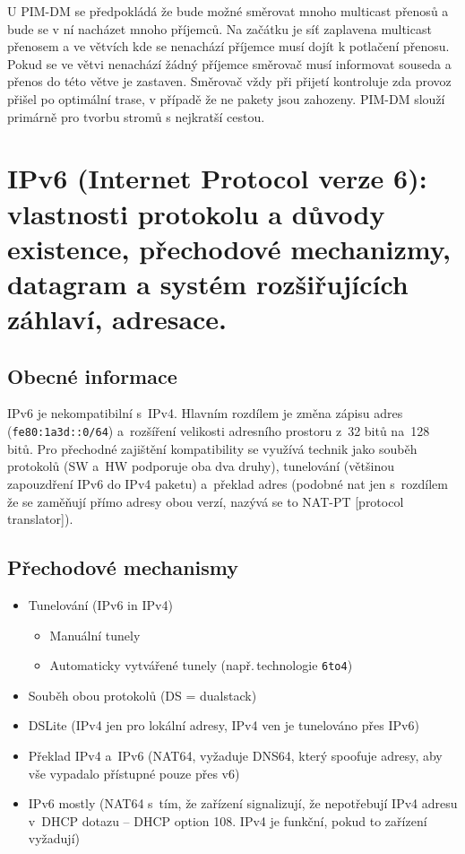 U PIM-DM se předpokládá že bude možné směrovat mnoho multicast přenosů a bude se v ní nacházet mnoho příjemců.
Na začátku je síť zaplavena multicast přenosem a ve větvích kde se nenachází příjemce musí dojít k potlačení přenosu.
Pokud se ve větvi nenachází žádný příjemce směrovač musí informovat souseda a přenos do této větve je zastaven.
Směrovač vždy při přijetí kontroluje zda provoz přišel po optimální trase, v případě že ne pakety jsou zahozeny.
PIM-DM slouží primárně pro tvorbu stromů s nejkratší cestou.


\clearpage
\section{IPv6 (Internet Protocol verze 6): vlastnosti protokolu a důvody existence, přechodové mechanizmy, datagram a systém rozšiřujících záhlaví, adresace.}

\subsection{Obecné informace}

IPv6 je nekompatibilní s~IPv4.
Hlavním rozdílem je změna zápisu adres (\texttt{fe80:1a3d::0/64}) a~rozšíření velikosti adresního prostoru z~32 bitů na~128 bitů.
Pro přechodné zajištění kompatibility se využívá technik jako souběh protokolů (SW a~HW podporuje oba dva druhy), tunelování (většinou zapouzdření IPv6 do IPv4 paketu) a~překlad adres (podobné nat jen s~rozdílem že se zaměňují přímo adresy obou verzí, nazývá se to NAT-PT [protocol translator]).


\subsection{Přechodové mechanismy}
\begin{itemize}
    \item Tunelování (IPv6 in IPv4)
    \begin{itemize}
        \item Manuální tunely
        \item Automaticky vytvářené tunely (např.\,technologie \texttt{6to4})
    \end{itemize}
    \item Souběh obou protokolů (DS = dualstack)
    \item DSLite (IPv4 jen pro lokální adresy, IPv4 ven je tunelováno přes IPv6)
    \item Překlad IPv4 a~IPv6 (NAT64, vyžaduje DNS64, který spoofuje adresy, aby vše vypadalo přístupné pouze přes v6)
    \item IPv6 mostly (NAT64 s~tím, že zařízení signalizují, že nepotřebují IPv4 adresu v~DHCP dotazu -- DHCP option 108. IPv4 je funkční, pokud to zařízení vyžadují)
\end{itemize}

